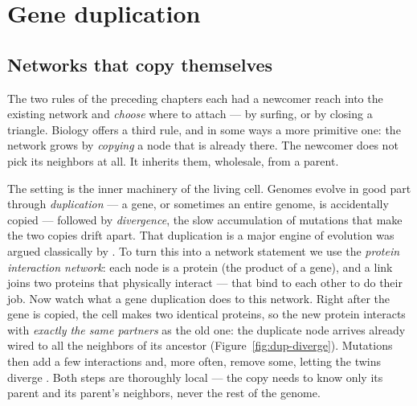 \chapter{Gene duplication}
\label{ch:duplication}

\section{Networks that copy themselves}

The two rules of the preceding chapters each had a newcomer reach into the
existing network and \emph{choose} where to attach --- by surfing, or by closing
a triangle. Biology offers a third rule, and in some ways a more primitive one:
the network grows by \emph{copying} a node that is already there. The newcomer
does not pick its neighbors at all. It inherits them, wholesale, from a parent.

The setting is the inner machinery of the living cell. Genomes evolve in good
part through \emph{duplication} --- a gene, or sometimes an entire genome, is
accidentally copied --- followed by \emph{divergence}, the slow accumulation of
mutations that make the two copies drift apart. That duplication is a major
engine of evolution was argued classically by \citet{ohno1970}. To turn this into
a network statement we use the \emph{protein interaction network}: each node is a
protein (the product of a gene), and a link joins two proteins that physically
interact --- that bind to each other to do their job. Now watch what a gene
duplication does to this network. Right after the gene is copied, the cell makes
two identical proteins, so the new protein interacts with \emph{exactly the same
partners} as the old one: the duplicate node arrives already wired to all the
neighbors of its ancestor (Figure~\ref{fig:dup-diverge}). Mutations then add a few
interactions and, more often,
remove some, letting the twins diverge \citep{wagner2001,sole2002}. Both steps
are thoroughly local --- the copy needs to know only its parent and its parent's
neighbors, never the rest of the genome.

